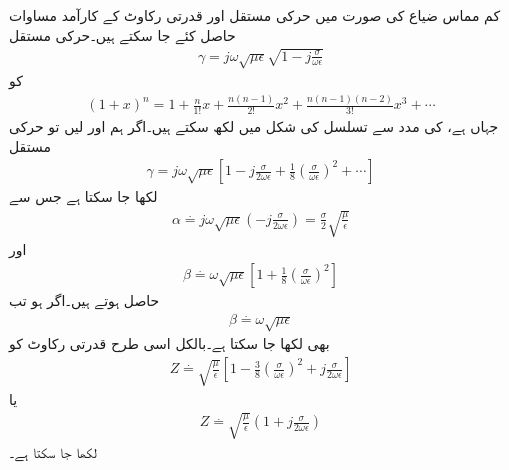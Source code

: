 کم مماس ضیاع کی صورت میں حرکی مستقل اور قدرتی رکاوٹ کے کارآمد مساوات حاصل کئے جا سکتے ہیں۔حرکی مستقل
\begin{align*}
\gamma = j \omega \sqrt{\mu \epsilon}\sqrt{1-j \frac{\sigma}{\omega \epsilon}}
\end{align*}
کو 
\begin{align*}
(1+x)^n=1+\frac{n}{1!}x+\frac{n(n-1)}{2!}x^2+\frac{n(n-1)(n-2)}{3!}x^3+\cdots
\end{align*}
جہاں  ہے، کی مدد سے  تسلسل کی شکل میں لکھ سکتے ہیں۔اگر ہم  اور  لیں تو حرکی مستقل 
\begin{align*}
\gamma=j \omega \sqrt{\mu \epsilon} \left[1-j\frac{\sigma}{2\omega \epsilon}+\frac{1}{8}\left(\frac{\sigma}{\omega \epsilon}\right)^2+\cdots \right]
\end{align*}
 لکھا جا سکتا ہے جس سے
\begin{align}\label{مساوات_موج_تضعیفی_سادہ}
\alpha \overset{.}{=} j \omega \sqrt{\mu \epsilon} \left(-j\frac{\sigma}{2\omega \epsilon} \right)=\frac{\sigma}{2}\sqrt{\frac{\mu}{\epsilon}}
\end{align}
اور 
\begin{align}\label{مساوات_موج_زاویائی_سادہ_الف}
\beta \overset{.}{=}\omega \sqrt{\mu \epsilon}\left[1+\frac{1}{8}\left(\frac{\sigma}{\omega \epsilon}\right)^2 \right]
\end{align}
حاصل ہوتے ہیں۔اگر  ہو تب
\begin{align}\label{مساوات_موج_زاویائی_سادہ_ب}
\beta \overset{.}{=}\omega \sqrt{\mu \epsilon}
\end{align}
بھی لکھا جا سکتا ہے۔بالکل اسی طرح قدرتی رکاوٹ کو
\begin{align}\label{مساوات_موج_رکاوٹ_سادہ_الف}
Z \overset{.}{=} \sqrt{\frac{\mu}{\epsilon}} \left[1-\frac{3}{8}\left(\frac{\sigma}{\omega \epsilon}\right)^2 +j \frac{\sigma}{2\omega \epsilon}\right]
\end{align}
یا
\begin{align}\label{مساوات_موج_رکاوٹ_سادہ_ب}
Z \overset{.}{=} \sqrt{\frac{\mu}{\epsilon}} \left(1 +j \frac{\sigma}{2\omega \epsilon}\right)
\end{align}
لکھا جا سکتا ہے۔

